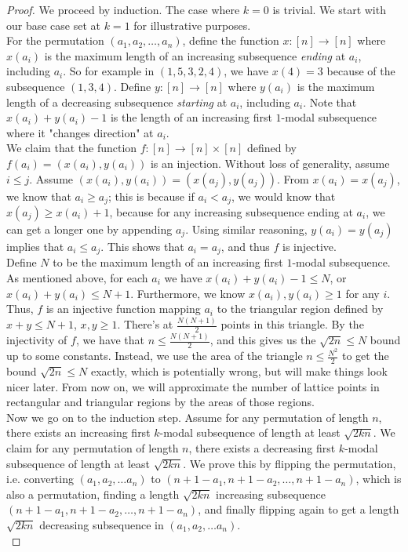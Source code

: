 \documentclass{article}
\begin{document}
\begin{proof}
We proceed by induction. The case where $k = 0$ is trivial. We start with our base case set at $k = 1$ for illustrative purposes. \\

For the permutation $(a_1, a_2, \ldots, a_n)$, define the function $x : [n] \rightarrow [n]$ where $x(a_i)$ is the maximum length of an increasing subsequence \emph{ending} at $a_i$, including $a_i$. So for example in $(1,5,3,2,4)$, we have $x(4) = 3$ because of the subsequence $(1,3,4)$. Define $y : [n] \rightarrow [n]$ where $y(a_i)$ is the maximum length of a decreasing subsequence \emph{starting} at $a_i$, including $a_i$. Note that $x(a_i) + y(a_i) - 1$ is the length of an increasing first $1$-modal subsequence where it "changes direction" at $a_i$. \\

We claim that the function $f : [n] \rightarrow [n] \times [n]$ defined by $f(a_i) = (x(a_i), y(a_i))$ is an injection. Without loss of generality, assume $i \leq j$. Assume $(x(a_i), y(a_i)) = (x(a_j), y(a_j))$. From $x(a_i) = x(a_j)$, we know that $a_i \geq a_j$; this is because if $a_i < a_j$, we would know that $x(a_j) \geq x(a_i) + 1$, because for any increasing subsequence ending at $a_i$, we can get a longer one by appending $a_j$. Using similar reasoning, $y(a_i) = y(a_j)$ implies that $a_i \leq a_j$. This shows that $a_i = a_j$, and thus $f$ is injective. \\

Define $N$ to be the maximum length of an increasing first $1$-modal subsequence. As mentioned above, for each $a_i$ we have $x(a_i) + y(a_i) - 1 \leq N$, or $x(a_i) + y(a_i) \leq N+1$. Furthermore, we know $x(a_i), y(a_i) \geq 1$ for any $i$. Thus, $f$ is an injective function mapping $a_i$ to the triangular region defined by $x + y \leq N+1$, $x, y \geq 1$. There's at $\frac{N(N+1)}{2}$ points in this triangle. By the injectivity of $f$, we have that $n \leq \frac{N(N+1)}{2}$, and this gives us the $\sqrt{2n} \leq N$ bound up to some constants. Instead, we use the area of the triangle $n \leq \frac{N^2}{2}$ to get the bound $\sqrt{2n} \leq N$ exactly, which is potentially wrong, but will make things look nicer later. From now on, we will approximate the number of lattice points in rectangular and triangular regions by the areas of those regions. \\

Now we go on to the induction step. Assume for any permutation of length $n$, there exists an increasing first $k$-modal subsequence of length at least $\sqrt{2kn}$. We claim for any permutation of length $n$, there exists a decreasing first $k$-modal subsequence of length at least $\sqrt{2kn}$. We prove this by flipping the permutation, i.e. converting $(a_1, a_2, \ldots a_n)$ to $(n+1-a_1, n+1-a_2, \ldots, n+1-a_n)$, which is also a permutation, finding a length $\sqrt{2kn}$ increasing subsequence $(n+1-a_1, n+1-a_2, \ldots, n+1-a_n)$, and finally flipping again to get a length $\sqrt{2kn}$ decreasing subsequence in $(a_1, a_2, \ldots a_n)$. \\


\end{proof}
\end{document}
